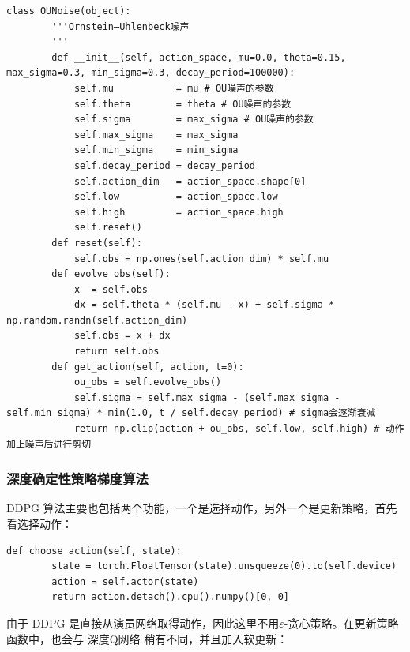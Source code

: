 \begin{lstlisting}[style=Python]
    class OUNoise(object):
        '''Ornstein–Uhlenbeck噪声
        '''
        def __init__(self, action_space, mu=0.0, theta=0.15, max_sigma=0.3, min_sigma=0.3, decay_period=100000):
            self.mu           = mu # OU噪声的参数
            self.theta        = theta # OU噪声的参数
            self.sigma        = max_sigma # OU噪声的参数
            self.max_sigma    = max_sigma
            self.min_sigma    = min_sigma
            self.decay_period = decay_period
            self.action_dim   = action_space.shape[0]
            self.low          = action_space.low
            self.high         = action_space.high
            self.reset()
        def reset(self):
            self.obs = np.ones(self.action_dim) * self.mu
        def evolve_obs(self):
            x  = self.obs
            dx = self.theta * (self.mu - x) + self.sigma * np.random.randn(self.action_dim)
            self.obs = x + dx
            return self.obs
        def get_action(self, action, t=0):
            ou_obs = self.evolve_obs()
            self.sigma = self.max_sigma - (self.max_sigma - self.min_sigma) * min(1.0, t / self.decay_period) # sigma会逐渐衰减
            return np.clip(action + ou_obs, self.low, self.high) # 动作加上噪声后进行剪切
\end{lstlisting}

\subsubsection{深度确定性策略梯度算法}

 DDPG 算法主要也包括两个功能，一个是选择动作，另外一个是更新策略，首先看选择动作：

\begin{lstlisting}[style=Python]
    def choose_action(self, state):
        state = torch.FloatTensor(state).unsqueeze(0).to(self.device)
        action = self.actor(state)
        return action.detach().cpu().numpy()[0, 0]
\end{lstlisting}

由于 DDPG 是直接从演员网络取得动作，因此这里不用$\varepsilon$-贪心策略。在更新策略函数中，也会与 深度Q网络 稍有不同，并且加入软更新：

